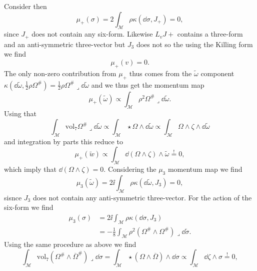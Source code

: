 Consider then
\begin{equation}
    \mu_+(\sigma) = 2\int_\mathcal{M}\rho\kappa(\dd\sigma,J_+) = 0,
\end{equation}
since $J_+$ does not contain any six-form. Likewise $L_vJ+$ contains a three-form and an anti-symmetric three-vector but $J_3$ does not so the using the Killing form we find 
\begin{equation}
    \mu_+(v) = 0.
\end{equation}
The only non-zero contribution from $\mu_+$ thus comes from the $\tilde{\omega}$ component $\kappa(\dd\tilde{\omega},\frac{1}{2}\rho\Omega^{\#})=\frac{1}{2}\rho\Omega^{\#}\lrcorner \dd\tilde{\omega}$ and we thus get the momentum map
\begin{equation}
    \mu_+(\tilde{\omega})\propto \int_\mathcal{M}\rho^2\Omega^{\#}\lrcorner \dd\tilde{\omega}.
\end{equation}
Using that 
\begin{equation}
\int_\mathcal{M}\text{vol}_7 \Omega^{\#}\lrcorner \dd\tilde{\omega}\propto \int_\mathcal{M}\star\Omega\wedge\dd\tilde{\omega}\propto\int_\mathcal{M}\Omega\wedge\zeta\wedge\dd\tilde{\omega}
\end{equation}
and integration by parts this reduce to 
\begin{equation}
    \mu_+(\tilde{w}) \propto \int_\mathcal{M}\dd(\Omega\wedge\zeta)\wedge\tilde{\omega} \overset{!}{=} 0,
\end{equation}
which imply that $\dd(\Omega\wedge\zeta)=0$. Considering the $\mu_3$ momentum map we find 
\begin{equation}
    \mu_3(\tilde{\omega}) = 2\ii\int_\mathcal{M}\rho\kappa(\dd\tilde{\omega},J_3) = 0,
\end{equation}
sisnce $J_3$ does not contain any anti-symmetric three-vector. For the action of the six-form we find 
\begin{equation}
    \begin{aligned}
    \mu_3(\sigma) &= 2\ii\int_\mathcal{M}\rho\kappa(\dd\sigma,J_3)\\
                  &=-\frac{1}{8}\int_\mathcal{M}\rho^2(\Omega^{\#}\wedge\Omega^{\#})\lrcorner \dd\tilde{\sigma}.
    \end{aligned}
\end{equation}
Using the same procedure as above we find
\begin{equation}
    \int_\mathcal{M}\text{vol}_7 (\Omega^{\#}\wedge \overbar{\Omega}^{\#})\lrcorner \dd\sigma =\int_\mathcal{M} \star(\Omega\wedge\overbar{\Omega})\wedge\dd\sigma \propto \int_\mathcal{M} \dd \zeta\wedge \sigma\overset{!}{=} 0,
\end{equation}
